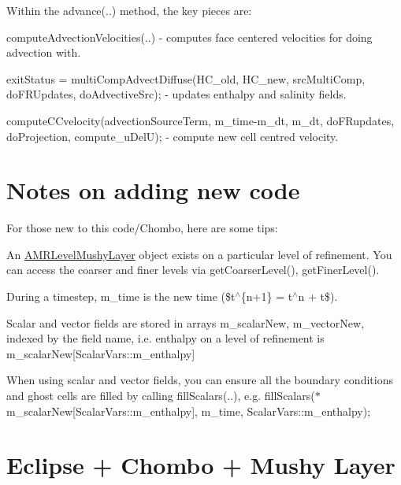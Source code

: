 Within the {\ttfamily advance(..)} method, the key pieces are\+:


\begin{DoxyItemize}
\item {\ttfamily compute\+Advection\+Velocities(..)} -\/ computes face centered velocities for doing advection with.
\item {\ttfamily exit\+Status = multi\+Comp\+Advect\+Diffuse(\+H\+C\+\_\+old, H\+C\+\_\+new, src\+Multi\+Comp, do\+F\+R\+Updates, do\+Advective\+Src);} -\/ updates enthalpy and salinity fields.
\item {\ttfamily compute\+C\+Cvelocity(advection\+Source\+Term, m\+\_\+time-\/m\+\_\+dt, m\+\_\+dt, do\+F\+Rupdates, do\+Projection, compute\+\_\+u\+DelU);} -\/ compute new cell centred velocity.
\end{DoxyItemize}

\section*{Notes on adding new code}

For those new to this code/\+Chombo, here are some tips\+:


\begin{DoxyItemize}
\item An \hyperlink{class_a_m_r_level_mushy_layer}{A\+M\+R\+Level\+Mushy\+Layer} object exists on a particular level of refinement. You can access the coarser and finer levels via {\ttfamily get\+Coarser\+Level()}, {\ttfamily get\+Finer\+Level()}.
\item During a timestep, {\ttfamily m\+\_\+time} is the new time (\$t$^\wedge$\{n+1\} = t$^\wedge$n +  t\$).
\item Scalar and vector fields are stored in arrays {\ttfamily m\+\_\+scalar\+New}, {\ttfamily m\+\_\+vector\+New}, indexed by the field name, i.\+e. enthalpy on a level of refinement is {\ttfamily m\+\_\+scalar\+New\mbox{[}Scalar\+Vars\+::m\+\_\+enthalpy\mbox{]}}
\item When using scalar and vector fields, you can ensure all the boundary conditions and ghost cells are filled by calling {\ttfamily fill\+Scalars(..)}, e.\+g. {\ttfamily fill\+Scalars($\ast$m\+\_\+scalar\+New\mbox{[}\+Scalar\+Vars\+::m\+\_\+enthalpy\mbox{]}, m\+\_\+time, Scalar\+Vars\+::m\+\_\+enthalpy);}
\end{DoxyItemize}

\section*{Eclipse + Chombo + Mushy Layer}

